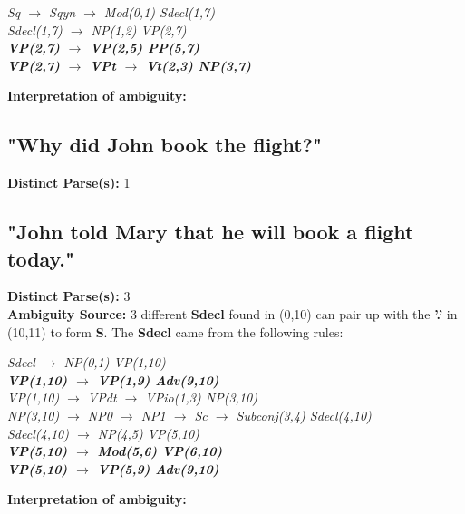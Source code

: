 \documentclass{article}
\begin{document}
\begin{center}
	\emph{Sq $\rightarrow$ Sqyn $\rightarrow$ Mod(0,1) Sdecl(1,7)}\\
	\emph{Sdecl(1,7) $\rightarrow$ NP(1,2) VP(2,7)}\\
	\textbf{\emph{VP(2,7) $\rightarrow$ VP(2,5) PP(5,7)}\\
	\emph{VP(2,7) $\rightarrow$ VPt $\rightarrow$ Vt(2,3) NP(3,7)}}
\end{center}

\textbf{Interpretation of ambiguity:}\\

\subsection{"Why did John book the flight?"}

\textbf{Distinct Parse(s):} 1

\subsection{"John told Mary that he will book a flight today."}

\textbf{Distinct Parse(s):} 3\\

\textbf{Ambiguity Source:} 3 different \textbf{Sdecl} found in (0,10) can pair up with the \textbf{'.'} in (10,11) to form \textbf{S}. The \textbf{Sdecl} came from the following rules:

\begin{center}
	\emph{Sdecl $\rightarrow$ NP(0,1) VP(1,10)}\\
	\textbf{\emph{VP(1,10) $\rightarrow$ VP(1,9) Adv(9,10)}}\\
	\emph{VP(1,10) $\rightarrow$ VPdt $\rightarrow$ VPio(1,3) NP(3,10)}\\
	
	\emph{NP(3,10) $\rightarrow$ NP0 $\rightarrow$ NP1 $\rightarrow$ Sc $\rightarrow$ Subconj(3,4) Sdecl(4,10)}\\
	\emph{Sdecl(4,10) $\rightarrow$ NP(4,5) VP(5,10)}\\
	\textbf{\emph{VP(5,10) $\rightarrow$ Mod(5,6) VP(6,10)}\\
	\emph{VP(5,10) $\rightarrow$ VP(5,9) Adv(9,10)}}
\end{center}

\textbf{Interpretation of ambiguity:}\\


\end{document}
